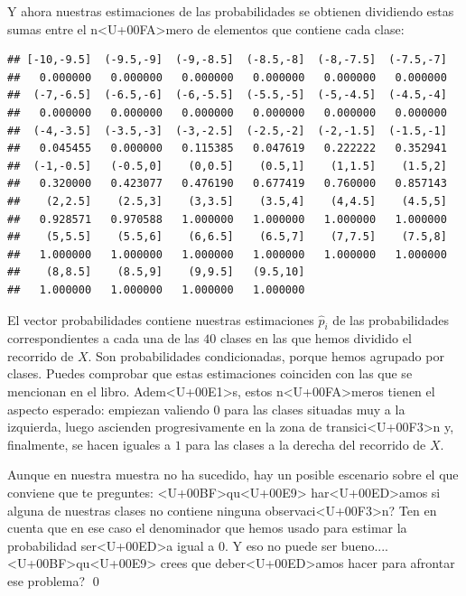 \documentclass[10pt,a4paper]{article}
\newcounter {cont01}
\begin{document}
\begin{enumerate}
Y ahora nuestras estimaciones de las probabilidades se obtienen dividiendo estas sumas entre el n<U+00FA>mero de elementos que contiene cada clase:
\begin{knitrout}
\color{fgcolor}\begin{kframe}
\begin{alltt}
 \hlkwb{=}  \hlopt{/} 
\end{alltt}
\begin{verbatim}
## [-10,-9.5]  (-9.5,-9]  (-9,-8.5]  (-8.5,-8]  (-8,-7.5]  (-7.5,-7] 
##   0.000000   0.000000   0.000000   0.000000   0.000000   0.000000 
##  (-7,-6.5]  (-6.5,-6]  (-6,-5.5]  (-5.5,-5]  (-5,-4.5]  (-4.5,-4] 
##   0.000000   0.000000   0.000000   0.000000   0.000000   0.000000 
##  (-4,-3.5]  (-3.5,-3]  (-3,-2.5]  (-2.5,-2]  (-2,-1.5]  (-1.5,-1] 
##   0.045455   0.000000   0.115385   0.047619   0.222222   0.352941 
##  (-1,-0.5]   (-0.5,0]    (0,0.5]    (0.5,1]    (1,1.5]    (1.5,2] 
##   0.320000   0.423077   0.476190   0.677419   0.760000   0.857143 
##    (2,2.5]    (2.5,3]    (3,3.5]    (3.5,4]    (4,4.5]    (4.5,5] 
##   0.928571   0.970588   1.000000   1.000000   1.000000   1.000000 
##    (5,5.5]    (5.5,6]    (6,6.5]    (6.5,7]    (7,7.5]    (7.5,8] 
##   1.000000   1.000000   1.000000   1.000000   1.000000   1.000000 
##    (8,8.5]    (8.5,9]    (9,9.5]   (9.5,10] 
##   1.000000   1.000000   1.000000   1.000000
\end{verbatim}
\end{kframe}
\end{knitrout}
El vector probabilidades contiene nuestras estimaciones $\hat p_i$ de las probabilidades correspondientes a cada una de las $40$ clases en las que hemos dividido el recorrido de $X$. Son probabilidades condicionadas, porque hemos agrupado por clases. Puedes comprobar que estas estimaciones coinciden con las que se mencionan en el libro. Adem<U+00E1>s, estos n<U+00FA>meros tienen el aspecto esperado: empiezan valiendo $0$ para las clases situadas muy a la izquierda, luego ascienden progresivamente en la zona de transici<U+00F3>n y, finalmente, se hacen iguales a $1$ para las clases a la derecha del recorrido de $X$.

\begin{ejercicio}
\label{tut13:ejercicio02}
Aunque en nuestra muestra no ha sucedido, hay un posible escenario sobre el que conviene que te preguntes: <U+00BF>qu<U+00E9> har<U+00ED>amos si alguna de nuestras clases no contiene ninguna observaci<U+00F3>n? Ten en cuenta que en ese caso el denominador que hemos usado para estimar la probabilidad ser<U+00ED>a igual a $0$.  Y eso no puede ser bueno.... <U+00BF>qu<U+00E9> crees que deber<U+00ED>amos hacer para afrontar ese problema?
\qed
\end{ejercicio}



\end{enumerate}
\end{document}
